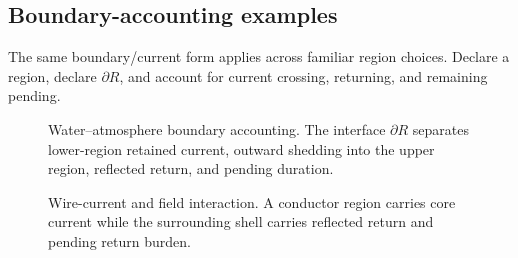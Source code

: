 \subsection{Boundary-accounting examples}\label{subsec:boundary-accounting-examples}
The same boundary/current form applies across familiar region choices. Declare a region, declare \(\partial R\), and account for current crossing, returning, and remaining pending.

\begin{figure}[H]
\centering
{}
\caption{Water--atmosphere boundary accounting. The interface \(\partial R\) separates lower-region retained current, outward shedding into the upper region, reflected return, and pending duration.}
\label{fig:v39-water-atmosphere-example}
\end{figure}

\begin{figure}[H]
\centering
{}
\caption{Wire-current and field interaction. A conductor region carries core current while the surrounding shell carries reflected return and pending return burden.}
\label{fig:v39-wire-current-example}
\end{figure}

